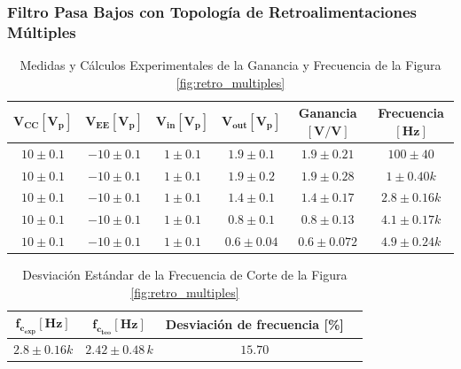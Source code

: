         \subsubsection{Filtro Pasa Bajos con Topología de Retroalimentaciones Múltiples}    

            \begin{table}[H]
              \centering
              \begin{tabular}{|c|c|c|c|c|c|}
                \hline
                $\mathbf{V_{CC} [V_p]}$ & $\mathbf{V_{EE} [V_p]}$ & $\mathbf{V_{in} [V_p]}$ & $\mathbf{V_{out} [V_p]}$ & \textbf{Ganancia} $\mathbf{[V/V]}$ & \textbf{Frecuencia} $\mathbf{[Hz]}$ \\
                \hline
                $10 \pm 0.1$ & $-10 \pm 0.1$ & $1 \pm 0.1$ & $1.9 \pm 0.1$ & $1.9 \pm 0.21$ & $100 \pm 40 $ \\
                \hline
                $10 \pm 0.1$ & $-10 \pm 0.1$ & $1 \pm 0.1$ & $1.9 \pm 0.2$ & $1.9 \pm 0.28$ & $1 \pm 0.40 k$ \\
                \hline
                $10 \pm 0.1$ & $-10 \pm 0.1$ & $1 \pm 0.1$ & $1.4 \pm 0.1 $ & $1.4 \pm 0.17$ & $2.8 \pm 0.16 k$ \\
                \hline
                $10 \pm 0.1$ & $-10 \pm 0.1$ & $1 \pm 0.1$ & $0.8 \pm 0.1$ & $0.8 \pm 0.13$ & $4.1 \pm 0.17 k$ \\
                \hline
                $10 \pm 0.1$ & $-10 \pm 0.1$ & $1 \pm 0.1$ & $ 0.6 \pm 0.04$ & $0.6 \pm 0.072$ & $4.9 \pm 0.24 k$ \\
                \hline
              \end{tabular}
              \caption{Medidas y Cálculos Experimentales de la Ganancia y Frecuencia de la Figura \ref{fig:retro_multiples}}
              \label{tab:exp_retro_multiples}
            \end{table}

             \begin{table}[H]
              \centering
              \begin{tabular}{|c|c|c|c|}
                \hline
                $\mathbf{f_{c_{exp}} [Hz]}$ & $\mathbf{f_{c_{teo}} [Hz]}$ & \textbf{Desviación de frecuencia [\%]} \\
                \hline
                $2.8 \pm 0.16 k$ & $2.42 \pm 0.48 \, k$ & $15.70$ \\
                \hline
              \end{tabular}
              \caption{Desviación Estándar de la Frecuencia de Corte de la Figura \ref{fig:retro_multiples}}
              \label{tab:exp_retro_multiples_frecorte}
            \end{table}

